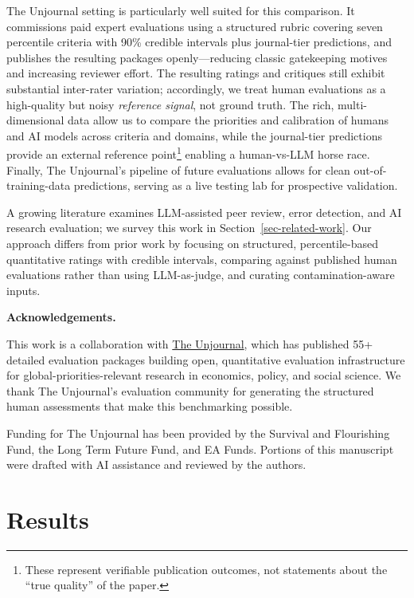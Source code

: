 \documentclass[
  11pt,
  letterpaper,
]{article}
\begin{document}
The Unjournal setting is particularly well suited for this comparison.
It commissions paid expert evaluations using a structured rubric
covering seven percentile criteria with 90\% credible intervals plus
journal-tier predictions, and publishes the resulting packages
openly---reducing classic gatekeeping motives and increasing reviewer
effort. The resulting ratings and critiques still exhibit substantial
inter-rater variation; accordingly, we treat human evaluations as a
high-quality but noisy \emph{reference signal}, not ground truth. The
rich, multi-dimensional data allow us to compare the priorities and
calibration of humans and AI models across criteria and domains, while
the journal-tier predictions provide an external reference
point\footnote{These represent verifiable publication outcomes, not
  statements about the ``true quality'' of the paper.} enabling a
human-vs-LLM horse race. Finally, The Unjournal's pipeline of future
evaluations allows for clean out-of-training-data predictions, serving
as a live testing lab for prospective validation.

A growing literature examines LLM-assisted peer review, error detection,
and AI research evaluation; we survey this work in
Section~\ref{sec-related-work}. Our approach differs from prior work by
focusing on structured, percentile-based quantitative ratings with
credible intervals, comparing against published human evaluations rather
than using LLM-as-judge, and curating contamination-aware inputs.

\textbf{Acknowledgements.}

This work is a collaboration with \href{https://unjournal.org}{The
Unjournal}, which has published 55+ detailed evaluation packages
building open, quantitative evaluation infrastructure for
global-priorities-relevant research in economics, policy, and social
science. We thank The Unjournal's evaluation community for generating
the structured human assessments that make this benchmarking possible.

Funding for The Unjournal has been provided by the Survival and
Flourishing Fund, the Long Term Future Fund, and EA Funds. Portions of
this manuscript were drafted with AI assistance and reviewed by the
authors.


\section{Results}\label{results}
\end{document}
